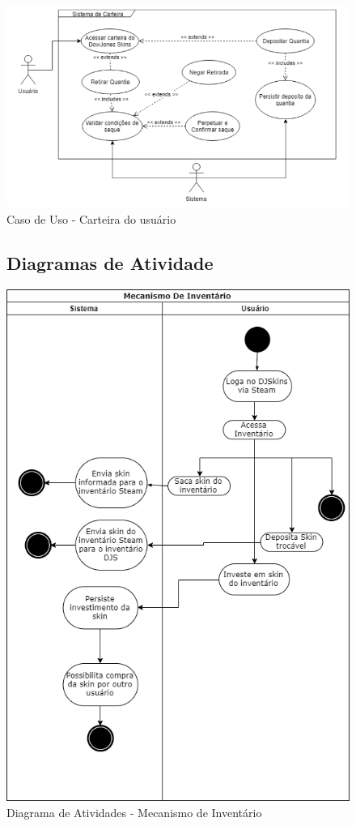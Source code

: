   \begin{figure}[!htb]
        \centering
        \includegraphics[scale=0.6]{Imagens/carteira.png}
        \caption{Caso de Uso - Carteira do usuário}
 \end{figure}

	\begin{figure}[!htb]
		\subsection{Diagramas de Atividade}
		\centering
		\includegraphics[scale=0.6]{Imagens/mec-inventario.png}
		\caption{Diagrama de Atividades - Mecanismo de Inventário}
	\end{figure}


